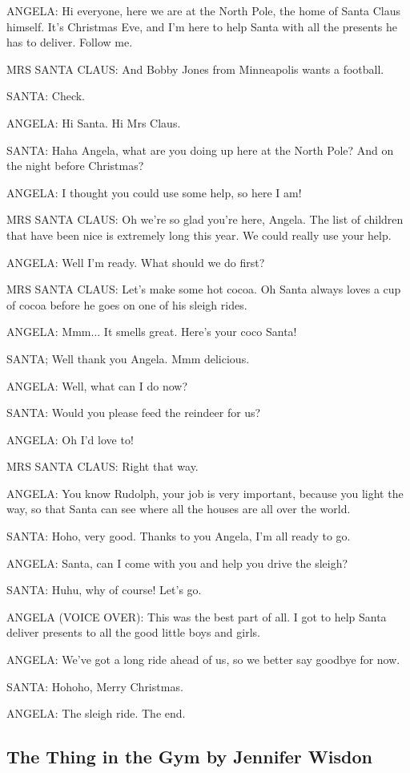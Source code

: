 ANGELA:
Hi everyone, here we are at the North Pole, the home of Santa Claus himself.
It's Christmas Eve, and I'm here to help Santa with all the presents he has to deliver.
Follow me.

MRS SANTA CLAUS:
And Bobby Jones from Minneapolis wants a football.

SANTA:
Check.

ANGELA:
Hi Santa.
Hi Mrs Claus.

SANTA:
Haha Angela, what are you doing up here at the North Pole?
And on the night before Christmas?

ANGELA:
I thought you could use some help, so here I am!

MRS SANTA CLAUS:
Oh we're so glad you're here, Angela.
The list of children that have been nice is extremely long this year.
We could really use your help.

ANGELA:
Well I'm ready.
What should we do first?

MRS SANTA CLAUS:
Let's make some hot cocoa.
Oh Santa always loves a cup of cocoa before he goes on one of his sleigh rides.

ANGELA:
Mmm...
It smells great.
Here's your coco Santa!

SANTA;
Well thank you Angela.
Mmm delicious.

ANGELA:
Well, what can I do now?

SANTA:
Would you please feed the reindeer for us?

ANGELA:
Oh I'd love to!

MRS SANTA CLAUS:
Right that way.

ANGELA:
You know Rudolph, your job is very important, because you light the way, so that Santa can see where all the houses are all over the world.

SANTA:
Hoho, very good.
Thanks to you Angela, I'm all ready to go.

ANGELA:
Santa, can I come with you and help you drive the sleigh?

SANTA:
Huhu, why of course!
Let's go.

ANGELA (VOICE OVER):
This was the best part of all.
I got to help Santa deliver presents to all the good little boys and girls.

ANGELA:
We've got a long ride ahead of us, so we better say goodbye for now.

SANTA:
Hohoho, Merry Christmas.

ANGELA:
The sleigh ride.
The end.

\subsection{The Thing in the Gym by Jennifer Wisdon}

